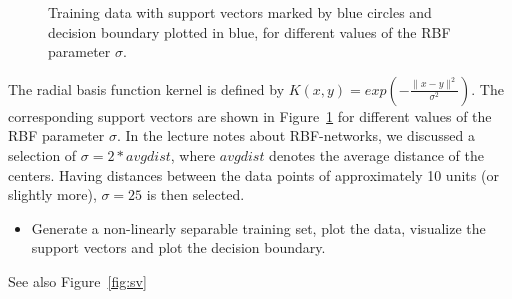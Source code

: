 \documentclass[a4]{article}
\begin{document}
\begin{figure}[h!]
\caption{Training data with support vectors marked by blue circles and decision boundary plotted in blue, for different values of the RBF parameter $\sigma$.}
\label{fig:sv_kernel}
\end{figure}
The radial basis function kernel is defined by $K(x,y) = exp(-\frac{\|x-y\|^2}{\sigma^2})$.
The corresponding support vectors are shown in Figure~\ref{fig:sv_kernel} for different values of the RBF parameter $\sigma$. In the lecture notes about RBF-networks, we discussed a selection of $\sigma= 2*avgdist$, where $avgdist$ denotes the average distance of the centers. Having distances between the data points of approximately 10 units (or slightly more), $\sigma= 25$ is then selected.

\begin{itemize}
\item Generate a non-linearly separable training set, plot the data, visualize the support vectors and plot the decision boundary.
\end{itemize}
See also Figure~\ref*{fig:sv}




% 
% 
\end{document}
